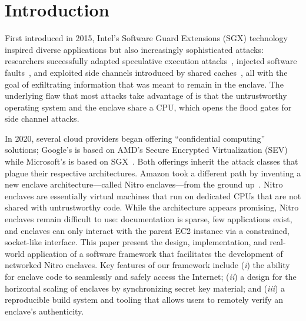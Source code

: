 \section{Introduction}

First introduced in 2015, Intel's Software Guard Extensions (SGX) technology
inspired diverse applications but also increasingly sophisticated attacks:
researchers successfully adapted speculative execution
attacks~\cite{VanBulck2018a}, injected software faults~\cite{Murdock2020a}, and
exploited side channels introduced by shared caches~\cite{Brasser2017a}, all
with the goal of exfiltrating information that was meant to remain in the
enclave.  The underlying flaw that most attacks take advantage of is that the
untrustworthy operating system and the enclave share a CPU, which opens the
flood gates for side channel attacks.

In 2020, several cloud providers began offering ``confidential computing''
solutions; Google's is based on AMD's Secure Encrypted Virtualization
(SEV)~\cite{googlecc} while Microsoft's is based on SGX~\cite{azurecc}.  Both
offerings inherit the attack classes that plague their respective architectures.
Amazon took a different path by inventing a new enclave architecture---called
Nitro enclaves---from the ground up~\cite{nitro-enclaves}.  Nitro enclaves are
essentially virtual machines that run on dedicated CPUs that are not shared with
untrustworthy code.  While the architecture appears promising, Nitro enclaves
remain difficult to use: documentation is sparse, few applications exist, and
enclaves can only interact with the parent EC2 instance via a constrained,
socket-like interface.  This paper present the design, implementation, and
real-world application of a software framework that facilitates the development
of networked Nitro enclaves.  Key features of our framework include
(\emph{i}) the ability for enclave code to seamlessly and safely access the
Internet;
(\emph{ii}) a design for the horizontal scaling of enclaves by synchronizing
secret key material; and
(\emph{iii}) a reproducible build system and tooling that allows users to
remotely verify an enclave's authenticity.

